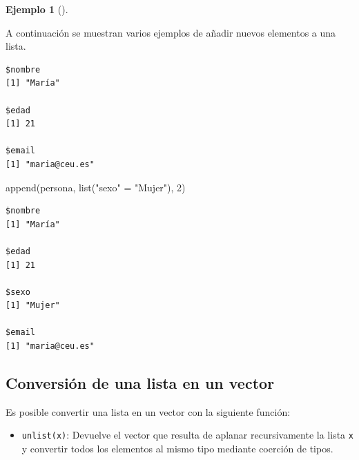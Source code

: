 \documentclass[
  a4paper,
]{scrreport}
\newenvironment{Shaded}{\begin{snugshade}}{\end{snugshade}}
\newcommand{\DecValTok}[1]{\textcolor[rgb]{0.68,0.00,0.00}{#1}}
\newcommand{\FunctionTok}[1]{\textcolor[rgb]{0.28,0.35,0.67}{#1}}
\newcommand{\NormalTok}[1]{\textcolor[rgb]{0.00,0.23,0.31}{#1}}
\newcommand{\OtherTok}[1]{\textcolor[rgb]{0.00,0.23,0.31}{#1}}
\newcommand{\SpecialCharTok}[1]{\textcolor[rgb]{0.37,0.37,0.37}{#1}}
\newcommand{\StringTok}[1]{\textcolor[rgb]{0.13,0.47,0.30}{#1}}
\providecommand{\tightlist}{%
  \setlength{\itemsep}{0pt}\setlength{\parskip}{0pt}}\usepackage{longtable,booktabs,array}
\theoremstyle{definition}
\newtheorem{example}{Ejemplo}[chapter]
\theoremstyle{definition}
\theoremstyle{remark}
\begin{document}
\leavevmode{}%
\begin{example}[]\label{exm-añadir-elementos-listas}

A continuación se muestran varios ejemplos de añadir nuevos elementos a
una lista.

\begin{Shaded}
\end{Shaded}

\begin{verbatim}
$nombre
[1] "María"

$edad
[1] 21

$email
[1] "maria@ceu.es"
\end{verbatim}

\begin{Shaded}
\begin{Highlighting}[]
\FunctionTok{append}\NormalTok{(persona, }\FunctionTok{list}\NormalTok{(}\StringTok{"sexo"} \OtherTok{=} \StringTok{"Mujer"}\NormalTok{), }\DecValTok{2}\NormalTok{)}
\end{Highlighting}
\end{Shaded}

\begin{verbatim}
$nombre
[1] "María"

$edad
[1] 21

$sexo
[1] "Mujer"

$email
[1] "maria@ceu.es"
\end{verbatim}

\end{example}

\hypertarget{conversiuxf3n-de-una-lista-en-un-vector}{%
\subsection{Conversión de una lista en un
vector}\label{conversiuxf3n-de-una-lista-en-un-vector}}

Es posible convertir una lista en un vector con la siguiente función:

\begin{itemize}
\tightlist
\item
  \texttt{unlist(x)}: Devuelve el vector que resulta de aplanar
  recursivamente la lista \texttt{x} y convertir todos los elementos al
  mismo tipo mediante coerción de tipos.
\end{itemize}
\end{document}
